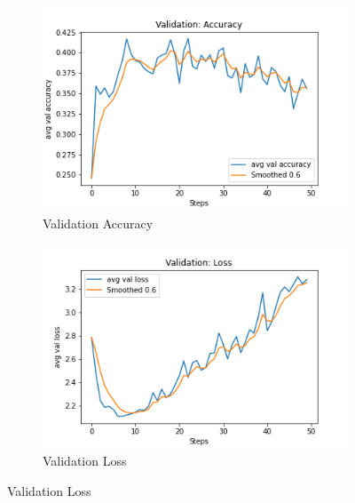 \begin{figure}[ht!]
     \centering
     \begin{subfigure}[b]{0.3\textwidth}
         \centering
         \includegraphics[width=\textwidth]{./figure/results/semantic_categories/eval/avg val accuracy.png}
         \caption{Validation Accuracy}
         \label{fig:category_accuracy}
     \end{subfigure}
     \hfill
     \begin{subfigure}[b]{0.3\textwidth}
         \centering
         \includegraphics[width=\textwidth]{./figure/results/semantic_categories/eval/avg val loss.png}
         \caption{Validation Loss}

\end{subfigure}
\end{figure}
